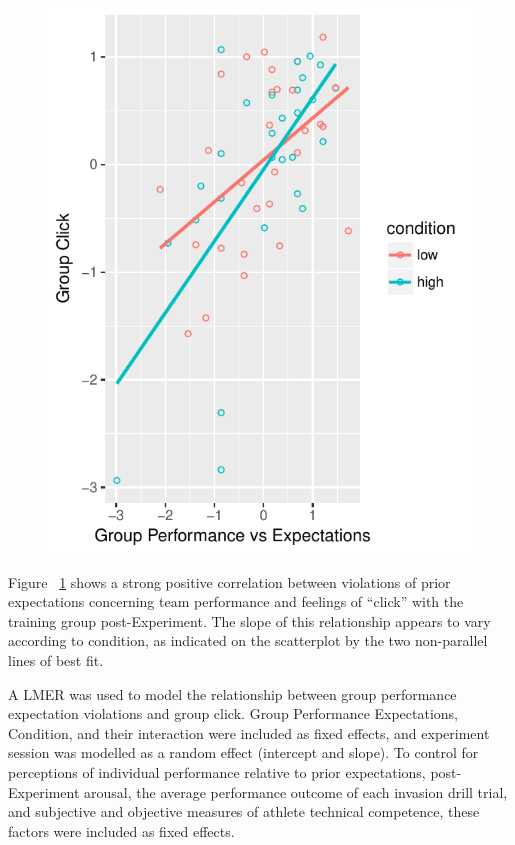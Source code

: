 

\begin{figure}
    \centering
    \includegraphics{images/teamPerfExpClickScatter}
    \label{fig:teamPerfExpClickScatter}
\end{figure}


Figure ~\ref{fig:teamPerfExpClickScatter} shows a strong positive correlation between violations of prior expectations concerning team performance and feelings of ``click'' with the training group post-Experiment.  The slope of this relationship appears to vary according to condition, as indicated on the scatterplot by the two non-parallel lines of best fit.

A LMER was used to model the relationship between group performance expectation violations and group click.  Group Performance Expectations, Condition, and their interaction were included as fixed effects, and experiment session was modelled as a random effect (intercept and slope).  To control for perceptions of individual performance relative to prior expectations, post-Experiment arousal, the average performance outcome of each invasion drill trial, and subjective and objective measures of athlete technical competence, these factors were included as fixed effects.

